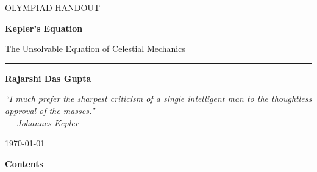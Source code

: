 \documentclass[12pt]{article}
\begin{document}
\begin{titlepage}
\begin{center}

\vspace*{2cm}

{\small\scshape\color{deepblue} OLYMPIAD HANDOUT}

\vspace{2cm}

{\titlefont\fontsize{42}{44}\selectfont\bfseries\color{deepblue} Kepler's Equation}

\vspace{0.8cm}

{\large The Unsolvable Equation of Celestial Mechanics}

\vspace{1cm}
\rule{0.35\textwidth}{0.5pt}

\vspace{2cm}

{\large \textbf{Rajarshi Das Gupta}}

\vspace{0.3cm}

\vspace{2.5cm}

\begin{minipage}{0.7\textwidth}
\centering
\itshape
``I much prefer the sharpest criticism of a single intelligent man to the thoughtless approval of the masses.''\\[0.3cm]
--- Johannes Kepler
\end{minipage}

\vfill

{\small \today}

\end{center}
\end{titlepage}


\newpage

\begin{center}
{\Large\bfseries\color{deepblue} Contents}
\end{center}

\vspace{0.8cm}
\end{document}
